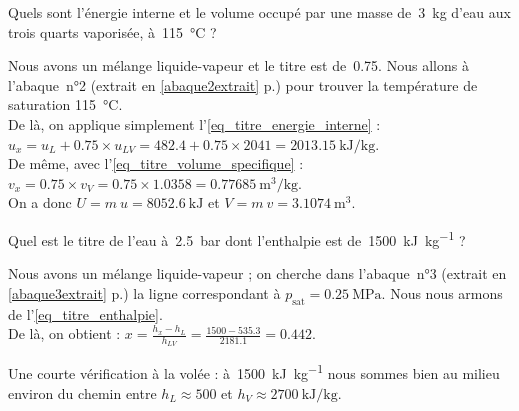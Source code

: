 			\begin{anexample}
			
			Quels sont l’énergie interne et le volume occupé par une masse de~\SI{3}{\kilogram} d’eau aux trois quarts vaporisée, à~\SI{115}{\degreeCelsius} ?
			
				\begin{answer}
				Nous avons un mélange liquide-vapeur et le titre est de~\num{0,75}. Nous allons à l’abaque~n°2 (extrait en \cref{abaque2extrait} p.\pageref{abaque2extrait}) pour trouver la température de saturation \SI{115}{\degreeCelsius}.\\
				De là, on applique simplement l’\cref{eq_titre_energie_interne} : $u_x = u_L + \num{0,75}\times u_{LV} = \num{482,4} + \num{0,75}\times\num{2041} = \SI{2013,15}{\kilo\joule\per\kilogram}$.\\
				De même, avec l’\cref{eq_titre_volume_specifique} : $v_x = \num{0,75}\times v_{V} = \num{0,75}\times\num{1,0358} = \SI{0,77685}{\metre\cubed\per\kilogram}$.\\				
				On a donc $U = m \ u = \SI{8052,6}{\kilo\joule} $ et $V = m \ v = \SI{3,1074}{\metre\cubed}$.
				\end{answer}
			\end{anexample}
		
			\begin{anexample}
			
			Quel est le titre de l’eau à~\SI{2,5}{\bar} dont l’enthalpie est de~\SI{1500}{\kilo\joule\per\kilogram} ?
			
				\begin{answer}
				Nous avons un mélange liquide-vapeur ; on cherche dans l’abaque~n°3 (extrait en \cref{abaque3extrait} p.\pageref{abaque3extrait}) la ligne correspondant à $p_\text{sat} = \SI{0,25}{\mega\pascal}$. Nous nous armons de l’\cref{eq_titre_enthalpie}.\\				
				De là, on obtient : $x = \frac{h_x - h_L}{h_{LV}} = \frac{\num{1500} - \num{535,3}}{\num{2181,1}} = \num{0,442} $.
				\begin{remark}Une courte vérification à la volée : à~\SI{1500}{\kilo\joule\per\kilogram} nous sommes bien au milieu environ du chemin entre $h_L \approx \num{500}$ et $h_V \approx \SI{2700}{\kilo\joule\per\kilogram}$. \end{remark}\end{answer}
			\end{anexample}





